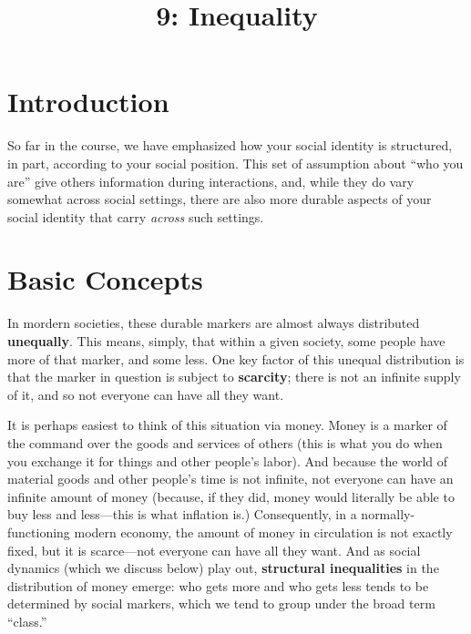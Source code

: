 \documentclass[
  letterpaper,
  DIV=11,
  numbers=noendperiod,
  oneside]{scrartcl}
\title{9: Inequality}
\author{}
\date{}
\begin{document}
\maketitle


\section{Introduction}\label{introduction}

So far in the course, we have emphasized how your social identity is
structured, in part, according to your social position. This set of
assumption about ``who you are'' give others information during
interactions, and, while they do vary somewhat across social settings,
there are also more durable aspects of your social identity that carry
\emph{across} such settings.

\section{Basic Concepts}\label{basic-concepts}

In mordern societies, these durable markers are almost always
distributed \textbf{unequally}. This means, simply, that within a given
society, some people have more of that marker, and some less. One key
factor of this unequal distribution is that the marker in question is
subject to \textbf{scarcity}; there is not an infinite supply of it, and
so not everyone can have all they want.

It is perhaps easiest to think of this situation via money. Money is a
marker of the command over the goods and services of others (this is
what you do when you exchange it for things and other people's labor).
And because the world of material goods and other people's time is not
infinite, not everyone can have an infinite amount of money (because, if
they did, money would literally be able to buy less and less---this is
what inflation is.) Consequently, in a normally-functioning modern
economy, the amount of money in circulation is not exactly
fixed, but it is scarce---not everyone
can have all they want. And as social dynamics (which we discuss below)
play out, \textbf{structural inequalities} in the distribution of money
emerge: who gets more and who gets less tends to be determined by social
markers, which we tend to group under the broad term ``class.''
\end{document}
